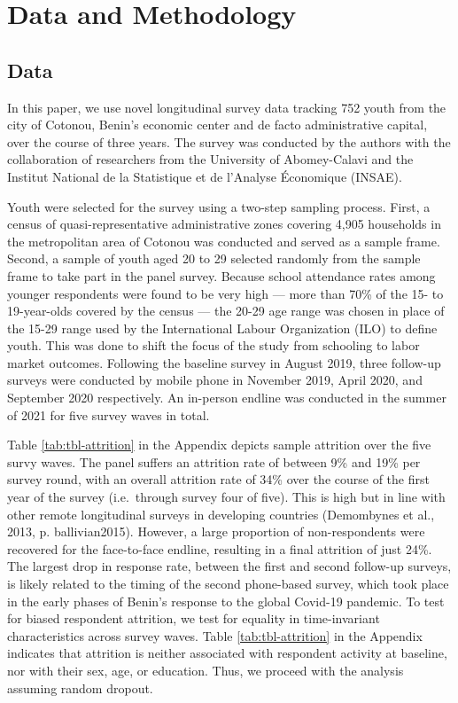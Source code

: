 \documentclass[
  11pt,
a4paper
]{article}
\begin{document}
\hypertarget{survey-datamethods}{%
\section{Data and Methodology}\label{survey-datamethods}}

\hypertarget{survey-data}{%
\subsection*{Data}\label{survey-data}}

In this paper, we use novel longitudinal survey data tracking 752 youth from the city of Cotonou, Benin's economic center and de facto administrative capital, over the course of three years. The survey was conducted by the authors with the collaboration of researchers from the University of Abomey-Calavi and the Institut National de la Statistique et de l'Analyse Économique (INSAE).

Youth were selected for the survey using a two-step sampling process. First, a census of quasi-representative administrative zones covering 4,905 households in the metropolitan area of Cotonou was conducted and served as a sample frame. Second, a sample of youth aged 20 to 29 selected randomly from the sample frame to take part in the panel survey. Because school attendance rates among younger respondents were found to be very high --- more than 70\% of the 15- to 19-year-olds covered by the census --- the 20-29 age range was chosen in place of the 15-29 range used by the International Labour Organization (ILO) to define youth. This was done to shift the focus of the study from schooling to labor market outcomes. Following the baseline survey in August 2019, three follow-up surveys were conducted by mobile phone in November 2019, April 2020, and September 2020 respectively. An in-person endline was conducted in the summer of 2021 for five survey waves in total.

Table \ref{tab:tbl-attrition} in the Appendix depicts sample attrition over the five survy waves. The panel suffers an attrition rate of between 9\% and 19\% per survey round, with an overall attrition rate of 34\% over the course of the first year of the survey (i.e.~through survey four of five). This is high but in line with other remote longitudinal surveys in developing countries (Demombynes et al., 2013, p. ballivian2015). However, a large proportion of non-respondents were recovered for the face-to-face endline, resulting in a final attrition of just 24\%. The largest drop in response rate, between the first and second follow-up surveys, is likely related to the timing of the second phone-based survey, which took place in the early phases of Benin's response to the global Covid-19 pandemic. To test for biased respondent attrition, we test for equality in time-invariant characteristics across survey waves. Table \ref{tab:tbl-attrition} in the Appendix indicates that attrition is neither associated with respondent activity at baseline, nor with their sex, age, or education. Thus, we proceed with the analysis assuming random dropout.
\end{document}

